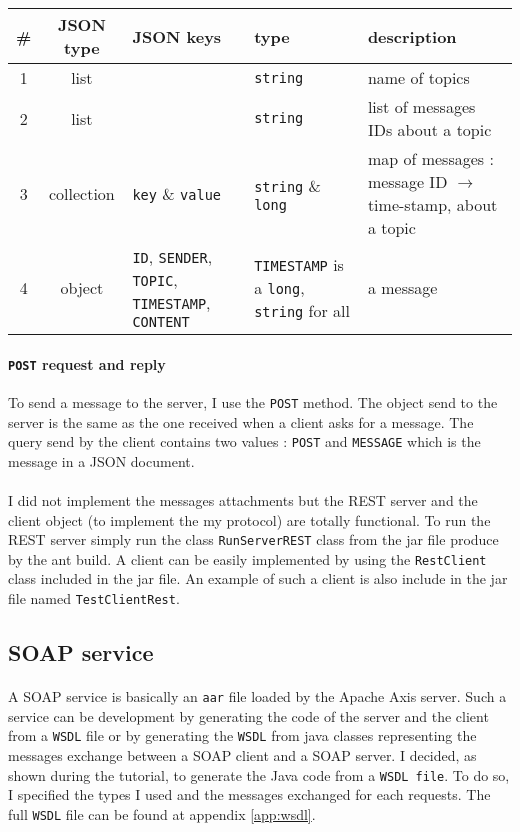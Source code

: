 \begin{tabular}{|c|c|p{2cm}|p{2cm}|p{3cm}|}
\hline
\# & JSON type & JSON keys & type & description \\
\hline
1 & list & & \texttt{string} & name of topics \\
\hline
2 & list & & \texttt{string} & list of messages IDs about a topic \\
\hline
3 & collection & \texttt{key} \& \texttt{value} & \texttt{string} \& \texttt{long} & map of messages : message ID $\rightarrow$ time-stamp, about a topic \\
\hline
4 & object & \texttt{ID}, \texttt{SENDER}, \texttt{TOPIC}, \texttt{TIMESTAMP}, \texttt{CONTENT} & \texttt{TIMESTAMP} is a \texttt{long}, \texttt{string} for all & a message \\
\hline
\end{tabular}

\paragraph{\texttt{POST} request and reply}{
    To send a message to the server, I use the \texttt{POST} method. The object
 send to the server is the same as the one received when a client asks for a
 message. The query send by the client contains two values : \texttt{POST} and 
 \texttt{MESSAGE} which is the message in a JSON document.
}

\paragraph{}{
    I did not implement the messages attachments but the REST server and the
 client object (to implement the my protocol) are totally functional. To run the
 REST server simply run the class \texttt{RunServerREST} class from the jar file
 produce by the ant build. A client can be easily implemented by using the 
 \texttt{RestClient} class included in the jar file. An example of such a client
 is also include in the jar file named \texttt{TestClientRest}.
}

\subsection{SOAP service}

\paragraph{}{
    A SOAP service is basically an \texttt{aar} file loaded by the Apache Axis 
 server. Such a service can be development by generating the code of the server 
 and the client from a \texttt{WSDL} file or by generating the \texttt{WSDL}
 from java classes representing the messages exchange between a SOAP client and
 a SOAP server. I decided, as shown during the tutorial, to generate the Java 
 code from a \texttt{WSDL file}. To do so, I specified the types I used and the
 messages exchanged for each requests. The full \texttt{WSDL} file can be found 
 at appendix \ref{app:wsdl}.
}

